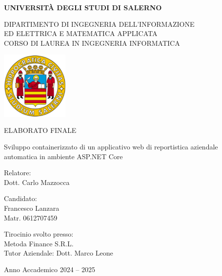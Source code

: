 
\begin{center}
	\textbf{\Large{UNIVERSITÀ DEGLI STUDI DI SALERNO}}

	\vspace{0.5cm}
	\large DIPARTIMENTO DI INGEGNERIA DELL'INFORMAZIONE \\
	ED ELETTRICA E MATEMATICA APPLICATA \\
	\vspace{0.2cm}
	CORSO DI LAUREA IN INGEGNERIA INFORMATICA
	\vspace{0.7cm}

	\includegraphics[width=0.25\textwidth]{fig/Logo_Unisa.png}
	\vspace{0.7cm}

	\large ELABORATO FINALE
	\vspace{0.5cm}
	\begin{center}
		\LARGE Sviluppo containerizzato di un applicativo web di reportistica aziendale automatica in ambiente ASP.NET Core
	\end{center}
	\vspace{1cm}

    \noindent
	\begin{minipage}[t]{0.45\textwidth}
	    Relatore: \\
	    Dott. Carlo Mazzocca
	\end{minipage}
	\hfill
	\begin{minipage}[t]{0.45\textwidth}
	    \hspace*{3cm}
		Candidato: \\
		\hspace*{3cm}
	    Francesco Lanzara \\
		\hspace*{3cm}
	    Matr. 0612707459
	\end{minipage}
\end{center}

\noindent
Tirocinio svolto presso: \\
Metoda Finance S.R.L. \\
Tutor Aziendale: Dott. Marco Leone
\vspace{2.5cm}
\begin{center}
	Anno Accademico 2024 -- 2025
\end{center}